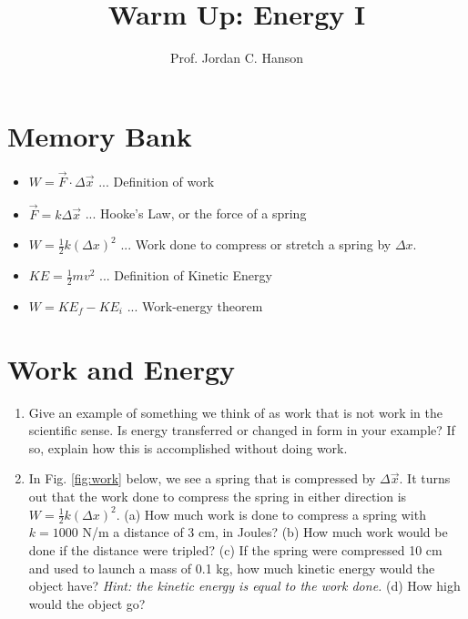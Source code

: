 \documentclass{article}
\begin{document}
\twocolumn

\title{Warm Up: Energy I}
\author{Prof. Jordan C. Hanson}

\maketitle

\section{Memory Bank}

\begin{itemize}
\item $W = \vec{F} \cdot \Delta \vec{x}$ ... Definition of work
\item $\vec{F} = k\Delta \vec{x}$ ... Hooke's Law, or the force of a spring
\item $W = \frac{1}{2}k(\Delta x)^2$ ... Work done to compress or stretch a spring by $\Delta x$.
\item $KE = \frac{1}{2}m v^2$ ... Definition of Kinetic Energy
\item $W = KE_f - KE_i$ ... Work-energy theorem
\end{itemize}

\section{Work and Energy}

\begin{enumerate}
\item Give an example of something we think of as work that is not work in the scientific sense. Is energy transferred or changed in form in your example? If so, explain how this is accomplished without doing work. \\ \vspace{3cm}
\item In Fig. \ref{fig:work} below, we see a spring that is compressed by $\Delta \vec{x}$.  It turns out that the work done to compress the spring in either direction is $W = \frac{1}{2} k (\Delta x)^2$.  (a) How much work is done to compress a spring with $k = 1000$ N/m a distance of 3 cm, in Joules?  (b) How much work would be done if the distance were tripled?  (c) If the spring were compressed 10 cm and used to launch a mass of 0.1 kg, how much kinetic energy would the object have? \textit{Hint: the kinetic energy is equal to the work done.} (d) How high would the object go? \\ \vspace{5cm}
\end{enumerate}
\end{document}
